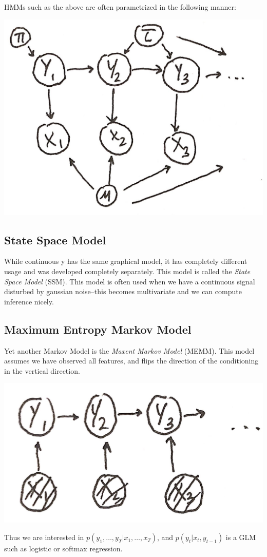 \documentclass{article}
\begin{document}
HMMs such as the above are often parametrized in the following manner:
\begin{center}
\includegraphics[scale=.1]{HMM_Param} 
\end{center}
\subsection{State Space Model}
While continuous y has the same graphical model, it has completely different usage and was developed completely separately. This model is called the \textit{State Space Model} (SSM). This model is often used when we have a continuous signal disturbed by gaussian noise--this becomes multivariate and we can compute inference nicely. 
\subsection{Maximum Entropy Markov Model}
Yet another Markov Model is the \textit{Maxent Markov Model} (MEMM). This model assumes we have observed all features, and flips the direction of the conditioning in the vertical direction.
\begin{center}
\includegraphics[scale=.1]{MEMM} 
\end{center}
Thus we are interested in $p(y_1,\ldots,y_T | x_1, \ldots, x_T)$, and $p(y_t|x_t,y_{t-1})$ is a GLM such as logistic or softmax regression.
\end{document}
